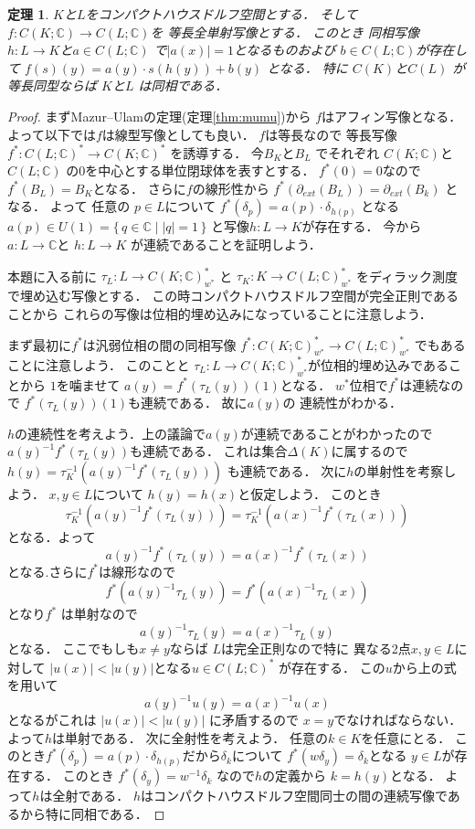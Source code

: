 \documentclass[leqno, a4paper, 12pt]{jsarticle}
\newtheorem{thm}{定理}
\newcommand{\cc}{\mathbb{C}}
\newcommand{\myextreme}[1]{\partial_{ext}(#1)}
\newcommand{\mydiracset}[1]{\Delta(#1)}
\newcommand{\mydirac}[1]{\delta_{#1}}
\begin{document}
\begin{thm}\label{thm:bsbs}
$K$と$L$をコンパクトハウスドルフ空間とする．
そして
$f\colon C(K; \cc)\to C(L; \cc)$を
等長全単射写像とする．
このとき
同相写像$h\colon L\to K$と$a\in C(L; \cc)$
で$|a(x)|=1$となるものおよび
$b\in C(L; \cc)$が存在して
$f(s)(y)=a(y)\cdot s(h(y))+b(y)$
となる．
特に
$C(K)$と$C(L)$
が等長同型ならば
$K$と$L$
は同相である．
\end{thm}
\begin{proof}
まずMazur--Ulamの定理(定理\ref{thm:mumu})から
$f$はアフィン写像となる．
よって以下では$f$は線型写像としても良い．
$f$は等長なので
等長写像$f^{*}\colon C(L; \cc)^{*}\to C(K; \cc)^{*}$
を誘導する．
今$B_{K}$と$B_{L}$
でそれぞれ
$C(K; \cc)$と$C(L; \cc)$
の$0$を中心とする単位閉球体を表すとする．
$f^{*}(0)=0$なので
$f^{*}(B_{L})=B_{K}$となる．
さらに$f$の線形性から
$f^{*}(\myextreme{B_{L}})=\myextreme{B_{k}}$
となる．
よって
任意の
$p\in L$について
$f^{*}(\mydirac{p})=a(p)\cdot \mydirac{h(p)}$
となる$a(p)\in U(1)=\{\, q\in \cc\mid |q|=1\, \}$
と写像$h\colon L\to K$が存在する．
今から$a\colon L\to \cc$と
$h\colon L\to K$
が連続であることを証明しよう．

本題に入る前に
$\tau_{L}\colon L\to C(K; \cc)^{*}_{w^{*}}$
と
$\tau_{K}\colon K\to C(L; \cc)^{*}_{w^{*}}$
をディラック測度で埋め込む写像とする．
この時コンパクトハウスドルフ空間が完全正則であることから
これらの写像は位相的埋め込みになっていることに注意しよう．

まず最初に$f^{*}$は汎弱位相の間の同相写像
$f^{*}\colon C(K; \cc)^{*}_{w^{*}}\to C(L; \cc)^{*}_{w^{*}}$
でもあることに注意しよう．
このことと
$\tau_{L}\colon L\to C(K; \cc)^{*}_{w^{*}}$が位相的埋め込みであることから
$1$を噛ませて
$a(y)=f^{*}(\tau_{L}(y))(1)$となる．
$w^{*}$位相で$f^{*}$は連続なので
$f^{*}(\tau_{L}(y))(1)$も連続である．
故に$a(y)$の
連続性がわかる．

$h$の連続性を考えよう．上の議論で$a(y)$が連続であることがわかったので
$a(y)^{-1}f^{*}(\tau_{L}(y))$も連続である．
これは集合$\mydiracset{K}$に属するので
$h(y)=\tau_{K}^{-1}(a(y)^{-1}f^{*}(\tau_{L}(y)))$
も連続である．
次に$h$の単射性を考察しよう．
$x, y\in L$について
$h(y)=h(x)$と仮定しよう．
このとき
\[
\tau_{K}^{-1}(a(y)^{-1}f^{*}(\tau_{L}(y)))
=\tau_{K}^{-1}(a(x)^{-1}f^{*}(\tau_{L}(x)))
\]
となる．よって
\[
a(y)^{-1}f^{*}(\tau_{L}(y))
=a(x)^{-1}f^{*}(\tau_{L}(x))
\]
となる.さらに$f^{*}$は線形なので
\[
f^{*}(a(y)^{-1}\tau_{L}(y))
=f^{*}(a(x)^{-1}\tau_{L}(x))
\]
となり$f^{*}$
は単射なので
\[
a(y)^{-1}\tau_{L}(y)=a(x)^{-1}\tau_{L}(y)
\]
となる．
ここでもしも$x\neq y$ならば
$L$は完全正則なので特に
異なる2点$x, y\in L$に対して
$|u(x)|< |u(y)|$となる$u\in C(L; \cc)^{*}$
が存在する．
この$u$から上の式を用いて
\[
a(y)^{-1}u(y)=a(x)^{-1}u(x)
\]
となるがこれは
$|u(x)|<|u(y)|$
に矛盾するので
$x=y$でなければならない．
よって$h$は単射である．
次に全射性を考えよう．
任意の$k\in K$を任意にとる．
このとき$f^{*}(\mydirac{p})=a(p)\cdot \mydirac{h(p)}$だから$\mydirac{k}$について
$f^{*}(w\mydirac{y})=\mydirac{k}$となる
$y\in L$が存在する．
このとき
$f^{*}(\mydirac{y})=w^{-1}\mydirac{k}$
なので$h$の定義から
$k=h(y)$となる．
よって$h$は全射である．
$h$はコンパクトハウスドルフ空間同士の間の連続写像であるから特に同相である．


\end{proof}
\end{document}
